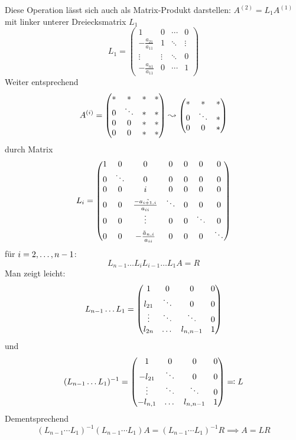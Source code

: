 \documentclass[../Skript.tex]{subfiles}
\begin{document}
Diese Operation lässt sich auch als Matrix-Produkt darstellen:
\(A^{(2)}=L_1A^{(1)}\) mit linker unterer Dreiecksmatrix \(L_1\)
\[
L_1=\begin{pmatrix}
    1 & 0 & \cdots & 0 \\
    -\frac{a_{21}}{a_{11}} & 1 & \ddots & \vdots \\
    \vdots & \vdots & \ddots & 0 \\
    -\frac{a_{n1}}{a_{11}} & 0 & \cdots & 1
\end{pmatrix}
\]
Weiter entsprechend \[
    A^{(i)} = \begin{pmatrix}
    * & * & *& *\\
    0&\ddots & *&*\\
    0& 0& *& * \\
    0 & 0 & * & *
    \end{pmatrix} \leadsto \begin{pmatrix}
    * & * & *\\
    0 & \ddots & *\\
    0 & 0 & *
    \end{pmatrix}
\]
durch Matrix \[
L_i = \begin{pmatrix}1 & 0 & 0 & 0 & 0 & 0 & 0\\
             0 & \ddots & 0& 0& 0 & 0& 0\\
             0 & 0 & i & 0 & 0 & 0 & 0\\
             0 & 0 & \frac{-\Tilde{a_{i+1, i}}}{a_{ii}} & \ddots & 0& 0 & 
             0\\
             0 & 0 & \vdots & 0 & 0 &\ddots& 0 \\
             0 & 0 & -\frac{\Tilde{a}_{n, i}}{a_{ii}} & 0 & 0 & 0&\ddots\end{pmatrix}
\]
für $\igb i 2 {n-1}$: \[
L_{n-1} \dots L_i L_{i-1} \dots L_1 A = R
\]
Man zeigt leicht: \[
    L_{n-1} \dots L_1 = \begin{pmatrix}1&0 &0 &0 \\
    l_{21} & \ddots & 0& 0 \\
    \vdots & \ddots & \ddots & 0\\
    l_{2n} & \dots & l_{n,n-1} & 1 \end{pmatrix}
\]
und \[
    (L_{n-1}\dots L_1)^{-1} = \begin{pmatrix}1 & 0 & 0 &0\\
    -l_{21} & \ddots & 0 & 0\\
    \vdots & \ddots & \ddots & 0\\
    -l_{n,1} & \dots & l_{n, n-1} & 1\end{pmatrix} \eqqcolon L
\]
Dementsprechend \[
    (L_{n-1} \cdots L_1)^{-1} (L_{n-1}\cdots L_1) A = (L_{n-1}\cdots 
    L_1)^{-1} R \implies A = LR
\]
\end{document}
